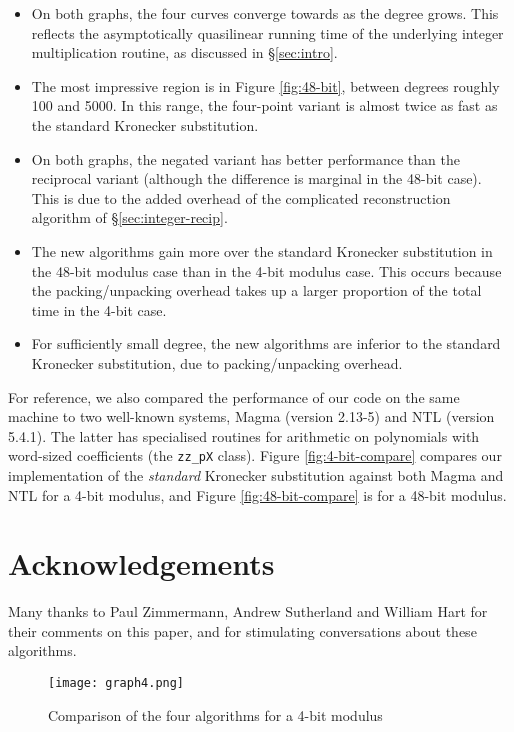 \documentclass{amsart}
\theoremstyle{definition}
\theoremstyle{remark}
\begin{document}
\begin{itemize}
\item On both graphs, the four curves converge towards  as the degree grows. This reflects the asymptotically quasilinear running time of the underlying integer multiplication routine, as discussed in \S\ref{sec:intro}.
\item The most impressive region is in Figure \ref{fig:48-bit}, between degrees roughly 100 and 5000. In this range, the four-point variant is almost twice as fast as the standard Kronecker substitution.
\item On both graphs, the negated variant has better performance than the reciprocal variant (although the difference is marginal in the 48-bit case). This is due to the added overhead of the complicated reconstruction algorithm of \S\ref{sec:integer-recip}.
\item The new algorithms gain more over the standard Kronecker substitution in the 48-bit modulus case than in the 4-bit modulus case. This occurs because the packing/unpacking overhead takes up a larger proportion of the total time in the 4-bit case.
\item For sufficiently small degree, the new algorithms are inferior to the standard Kronecker substitution, due to packing/unpacking overhead.
\end{itemize}

For reference, we also compared the performance of our code on the same machine to two well-known systems, Magma (version 2.13-5) and NTL (version 5.4.1). The latter has specialised routines for arithmetic on polynomials with word-sized coefficients (the \texttt{zz\_pX} class). Figure \ref{fig:4-bit-compare} compares our implementation of the \emph{standard} Kronecker substitution against both Magma and NTL for a 4-bit modulus, and Figure \ref{fig:48-bit-compare} is for a 48-bit modulus.


\section*{Acknowledgements}

Many thanks to Paul Zimmermann, Andrew Sutherland and William Hart for their comments on this paper, and for stimulating conversations about these algorithms.





\newpage

\begin{figure}
\begin{center}
\texttt{[image: graph4.png]}
\caption{Comparison of the four algorithms for a 4-bit modulus}
\label{fig:4-bit}
\end{center}
\end{figure}
\end{document}
